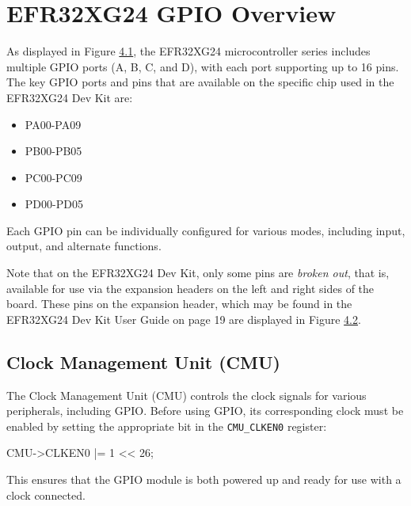\documentclass[
  9pt,
  letterpaper,
  abstract,
  titlepage]{scrbook}
\newenvironment{Shaded}{\begin{snugshade}}{\end{snugshade}}
\newcommand{\DecValTok}[1]{\textcolor[rgb]{0.68,0.00,0.00}{#1}}
\newcommand{\NormalTok}[1]{\textcolor[rgb]{0.00,0.23,0.31}{#1}}
\newcommand{\OperatorTok}[1]{\textcolor[rgb]{0.37,0.37,0.37}{#1}}
\begin{document}
\section{EFR32XG24 GPIO Overview}\label{efr32xg24-gpio-overview}

As displayed in Figure \hyperref[fig:efr32mg24pinout]{4.1}, the
EFR32XG24 microcontroller series includes multiple GPIO ports (A, B, C,
and D), with each port supporting up to 16 pins. The key GPIO ports and
pins that are available on the specific chip used in the EFR32XG24 Dev
Kit are:

\begin{itemize}
\item
  PA00-PA09
\item
  PB00-PB05
\item
  PC00-PC09
\item
  PD00-PD05
\end{itemize}

Each GPIO pin can be individually configured for various modes,
including input, output, and alternate functions.

Note that on the EFR32XG24 Dev Kit, only some pins are \emph{broken
out}, that is, available for use via the expansion headers on the left
and right sides of the board. These pins on the expansion header, which
may be found in the EFR32XG24 Dev Kit User Guide on page 19 are
displayed in Figure \hyperref[fig:efr32xg24devkitpinout]{4.2}.

\subsection{Clock Management Unit
(CMU)}\label{clock-management-unit-cmu}

The Clock Management Unit (CMU) controls the clock signals for various
peripherals, including GPIO. Before using GPIO, its corresponding clock
must be enabled by setting the appropriate bit in the
\texttt{CMU\_CLKEN0} register:

\begin{Shaded}
\begin{Highlighting}[]
\NormalTok{CMU}\OperatorTok{{-}\textgreater{}}\NormalTok{CLKEN0 }\OperatorTok{|=} \DecValTok{1} \OperatorTok{\textless{}\textless{}} \DecValTok{26}\OperatorTok{;}
\end{Highlighting}
\end{Shaded}

This ensures that the GPIO module is both powered up and ready for use
with a clock connected.
\end{document}

